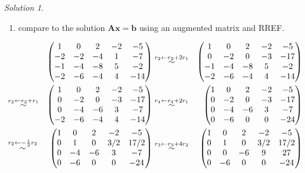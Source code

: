 \documentclass[
]{book}
\providecommand{\tightlist}{%
  \setlength{\itemsep}{0pt}\setlength{\parskip}{0pt}}
\theoremstyle{definition}
\theoremstyle{definition}
\theoremstyle{definition}
\theoremstyle{definition}
\theoremstyle{remark}
\newtheorem*{solution}{Solution}
\begin{document}
\begin{solution}
\begin{enumerate}
\def\labelenumi{\arabic{enumi})}
\setcounter{enumi}{2}
\tightlist
\item
  compare to the solution \(\mathbf{A}\mathbf{x} = \mathbf{b}\) using an augmented matrix and RREF.
\end{enumerate}

\[
\begin{aligned}
& & \begin{pmatrix} 1 & 0 & 2 & -2 & -5 \\ -2 & -2 & -4 & 1 & -7 \\ -1 & -4 & -8 & 5 & -2 \\ -2 & -6 & -4 & 4 & -14 \end{pmatrix} & \stackrel{r_2 \leftarrow r_2 + 2 r_1}{\huge \sim} & \begin{pmatrix} 1 & 0 & 2 & -2 & -5 \\ 0 & -2 & 0 & -3 & -17 \\ -1 & -4 & -8 & 5 & -2 \\ -2 & -6 & -4 & 4 & -14 \end{pmatrix} \\
& \stackrel{r_3 \leftarrow r_3 + r_1}{\huge \sim} & \begin{pmatrix} 1 & 0 & 2 & -2 & -5 \\ 0 & -2 & 0 & -3 & -17 \\ 0 & -4 & -6 & 3 & -7 \\ -2 & -6 & -4 & 4 & -14 \end{pmatrix} & \stackrel{r_4 \leftarrow r_4 + 2 r_1}{\huge \sim} & \begin{pmatrix} 1 & 0 & 2 & -2 & -5 \\ 0 & -2 & 0 & -3 & -17 \\ 0 & -4 & -6 & 3 & -7 \\ 0 & -6 & 0 & 0 & -24 \end{pmatrix} \\
& \stackrel{r_2 \leftarrow - \frac{1}{2} r_2}{\huge \sim} & \begin{pmatrix} 1 & 0 & 2 & -2 & -5 \\ 0 & 1 & 0 & 3/2 & 17/2 \\ 0 & -4 & -6 & 3 & -7 \\ 0 & -6 & 0 & 0 & -24 \end{pmatrix} & \stackrel{r_3 \leftarrow r_3 + 4 r_2}{\huge \sim} & \begin{pmatrix} 1 & 0 & 2 & -2 & -5 \\ 0 & 1 & 0 & 3/2 & 17/2 \\ 0 & 0 & -6 & 9 & 27 \\ 0 & -6 & 0 & 0 & -24 \end{pmatrix} \\

\end{aligned}\]
\end{solution}
\end{document}
